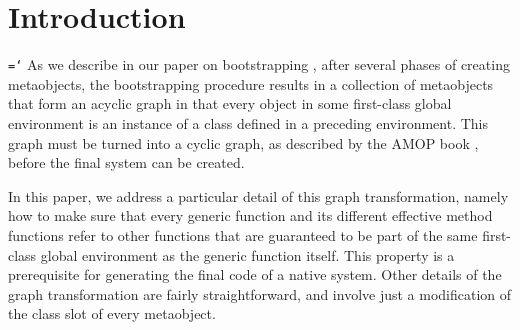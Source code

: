 \section{Introduction}
\label{sec-introduction}

\texttt{\hyphenchar\font=`\-}
As we describe in our paper on bootstrapping
\cite{Durand-Strandh:2019:ELS:Bootstrapping}, after several phases of
creating metaobjects, the bootstrapping procedure results in a
collection of metaobjects that form an acyclic graph in that every
object in some first-class global environment is an instance of a
class defined in a preceding environment.  This graph must be turned
into a cyclic graph, as described by the AMOP book
\cite{Kiczales:1991:AMP:574212}, before the final system can be
created.

In this paper, we address a particular detail of this graph
transformation, namely how to make sure that every generic function
and its different effective method functions refer to other functions
that are guaranteed to be part of the same first-class global
environment as the generic function itself.  This property is a
prerequisite for generating the final code of a native \sicl{}
system. Other details of the graph transformation are fairly
straightforward, and involve just a modification of the class slot of
every metaobject.
